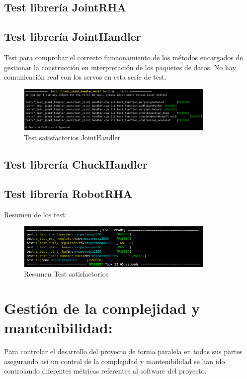 	\subsection{Test librería JointRHA}
	\subsection{Test librería JointHandler}
		Test para comprobar el correcto funcionamiento de los métodos encargados de gestionar la construcción en interpretación de los paquetes de datos. No hay comunicación real con los servos en esta serie de test.
		\begin{figure}[H]
			\centering
			\includegraphics[width=0.85\textwidth]{figuras/Imagenes_SW/test/Seleccion_035.png}   
			\caption{Test satisfactorios JointHandler}
			\label{fig:SW:test:joint_handler_ok}
		\end{figure}
	\subsection{Test librería ChuckHandler}
	\subsection{Test librería RobotRHA}
	
	Resumen de los test:
	\begin{figure}[H]
		\centering
		\includegraphics[width=0.85\textwidth]{figuras/Imagenes_SW/test/Seleccion_038.png}   
		\caption{Resumen Test satisfactorios}
		\label{fig:SW:test:sum_ok}
	\end{figure}
	
\section{Gestión de la complejidad y mantenibilidad:} \label{sec:SW:gestion_complejidad}
    Para controlar el desarrollo del proyecto de forma paralela en todas sus partes asegurando así un control de la complejidad y mantenibilidad se han ido controlando diferentes métricas referentes al software del proyecto. 
    \\ 
    
